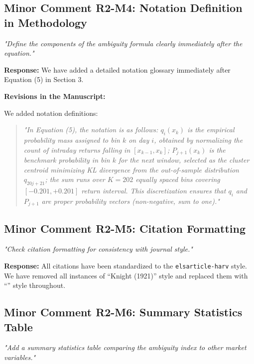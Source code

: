 \documentclass[12pt]{article}
\begin{document}
\subsection*{Minor Comment R2-M4: Notation Definition in Methodology}
\textit{"Define the components of the ambiguity formula clearly immediately after the equation."}

\begin{highlightbox}
\textbf{Response:} We have added a detailed notation glossary immediately after Equation (5) in Section 3.
\end{highlightbox}

\begin{highlightbox}
\textbf{Revisions in the Manuscript:}

We added notation definitions:
\vspace{0.2cm}
\begin{quote}
\itshape "In Equation (5), the notation is as follows: $q_i(x_k)$ is the empirical probability mass assigned to bin $k$ on day $i$, obtained by normalizing the count of intraday returns falling in $[x_{k-1}, x_k]$; $P_{j+1}(x_k)$ is the benchmark probability in bin $k$ for the next window, selected as the cluster centroid minimizing KL divergence from the out-of-sample distribution $q_{20j+21}$; the sum runs over $K=202$ equally spaced bins covering $[-0.201, +0.201]$ return interval. This discretization ensures that $q_i$ and $P_{j+1}$ are proper probability vectors (non-negative, sum to one)."
\end{quote}
\end{highlightbox}

\subsection*{Minor Comment R2-M5: Citation Formatting}
\textit{"Check citation formatting for consistency with journal style."}

\begin{highlightbox}
\textbf{Response:} All citations have been standardized to the \texttt{elsarticle-harv} style. We have removed all instances of ``Knight (1921)'' style and replaced them with ``\citet{Knight1921}'' style throughout.
\end{highlightbox}

\subsection*{Minor Comment R2-M6: Summary Statistics Table}
\textit{"Add a summary statistics table comparing the ambiguity index to other market variables."}
\end{document}
